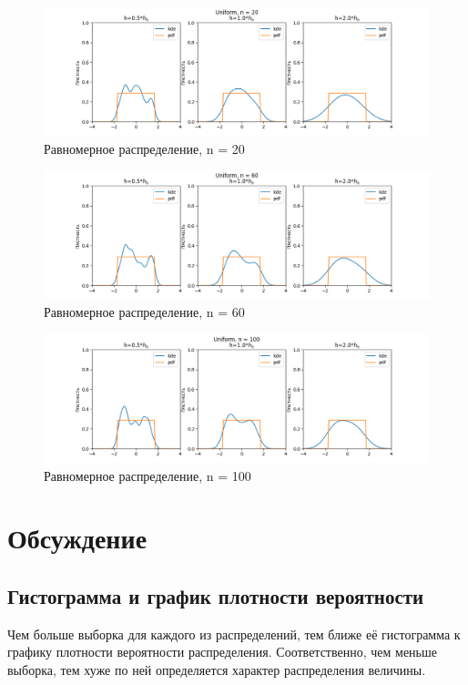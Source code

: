 \documentclass[12pt]{article}
\begin{document}
\begin{figure}
  \centering
  \includegraphics[width=0.8\paperwidth ]{../images/kde/Uniform_20.png}
  \caption{Равномерное распределение, n = 20}
\end{figure}

\begin{figure}
  \centering
  \includegraphics[width=0.8\paperwidth ]{../images/kde/Uniform_60.png}
  \caption{Равномерное распределение, n = 60}
\end{figure}

\begin{figure}[!ht]
  \centering
  \includegraphics[width=0.8\paperwidth ]{../images/kde/Uniform_100.png}
  \caption{Равномерное распределение, n = 100}
\end{figure}


\FloatBarrier
\section{Обсуждение}
\subsection{Гистограмма и график плотности вероятности}
Чем больше выборка для каждого из распределений, тем ближе
её гистограмма к графику плотности вероятности распределения. Соответственно,
чем меньше выборка, тем хуже по ней определяется характер распределения
величины.
\end{document}
